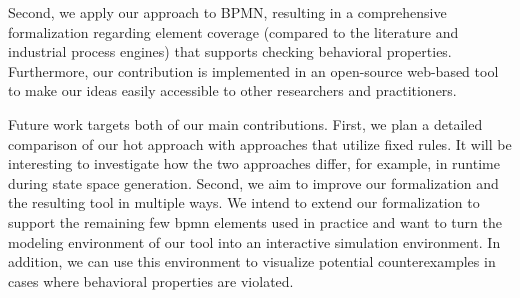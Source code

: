 \documentclass[runningheads]{lmcs}
\begin{document}
Second, we apply our approach to BPMN, resulting in a comprehensive formalization regarding element coverage (compared to the literature and industrial process engines) that supports checking behavioral properties.
Furthermore, our contribution is implemented in an open-source web-based tool to make our ideas easily accessible to other researchers and practitioners.

Future work targets both of our main contributions.
First, we plan a detailed comparison of our \gls*{hot} approach with approaches that utilize fixed rules.
It will be interesting to investigate how the two approaches differ, for example, in runtime during state space generation.
Second, we aim to improve our formalization and the resulting tool in multiple ways.
We intend to extend our formalization to support the remaining few \gls*{bpmn} elements used in practice and want to turn the modeling environment of our tool into an interactive simulation environment.
In addition, we can use this environment to visualize potential counterexamples in cases where behavioral properties are violated.

 





\end{document}
